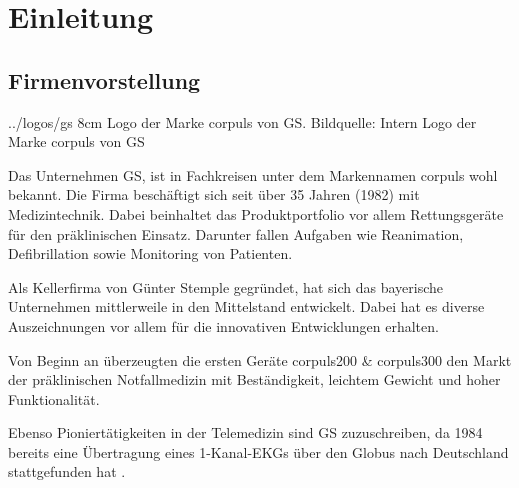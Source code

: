 \chapter{Einleitung}
\label{einleitung}
\minitoc\pagebreak


\section{Firmenvorstellung}
\bild
{../logos/gs}
{8cm}
{Logo der Marke \glqq corpuls\grqq{} von \acrlong*{GS}. Bildquelle: Intern}
{Logo der Marke \glqq corpuls\grqq{} von GS}

Das Unternehmen \gls{GS}, ist in Fachkreisen unter dem Markennamen \glqq corpuls\grqq{} wohl bekannt. 
Die Firma beschäftigt sich seit über 35 Jahren (1982) mit Medizintechnik.
Dabei beinhaltet das Produktportfolio vor allem Rettungsgeräte für den präklinischen Einsatz.
Darunter fallen Aufgaben wie Reanimation, Defibrillation sowie Monitoring von Patienten. 

Als Kellerfirma von Günter Stemple gegründet, hat sich das bayerische Unternehmen mittlerweile in den Mittelstand entwickelt.
Dabei hat es diverse Auszeichnungen vor allem für die innovativen Entwicklungen erhalten.

Von Beginn an überzeugten die ersten Geräte corpuls200 \& corpuls300 den Markt der präklinischen Notfallmedizin mit Beständigkeit, leichtem Gewicht und hoher Funktionalität. 

Ebenso Pioniertätigkeiten in der Telemedizin sind \gls{GS} zuzuschreiben, da 1984 bereits eine Übertragung eines 1-Kanal-EKGs über den Globus nach Deutschland stattgefunden hat \cite{GSElektromedizinischeGerateG.StempleGmbH.}.


